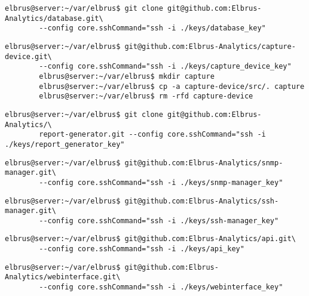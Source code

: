 \documentclass{article}
\begin{document}
	\begin{lstlisting}[caption={Clonen der Datenbank Software.}]
		elbrus@server:~/var/elbrus$ git clone git@github.com:Elbrus-Analytics/database.git\
		--config core.sshCommand="ssh -i ./keys/database_key"
	\end{lstlisting}
	
	\begin{lstlisting}[caption={Clonen der Capture-Device Software.}]
		elbrus@server:~/var/elbrus$ git@github.com:Elbrus-Analytics/capture-device.git\
		--config core.sshCommand="ssh -i ./keys/capture_device_key"
		elbrus@server:~/var/elbrus$ mkdir capture
		elbrus@server:~/var/elbrus$ cp -a capture-device/src/. capture
		elbrus@server:~/var/elbrus$ rm -rfd capture-device
	\end{lstlisting}
	

	\begin{lstlisting}[caption={Clonen der Report-Generator Software.}]
		elbrus@server:~/var/elbrus$ git clone git@github.com:Elbrus-Analytics/\
		report-generator.git --config core.sshCommand="ssh -i ./keys/report_generator_key"
	\end{lstlisting}
	
	\newpage
	\begin{lstlisting}[caption={Clonen der SNMP-Manager Software.}]
		elbrus@server:~/var/elbrus$ git@github.com:Elbrus-Analytics/snmp-manager.git\
		--config core.sshCommand="ssh -i ./keys/snmp-manager_key"
	\end{lstlisting}

	\begin{lstlisting}[caption={Clonen der SSH-Manager Software.}]
		elbrus@server:~/var/elbrus$ git@github.com:Elbrus-Analytics/ssh-manager.git\
		--config core.sshCommand="ssh -i ./keys/ssh-manager_key"
	\end{lstlisting}
	
	\begin{lstlisting}[caption={Clonen der API Software.}]
		elbrus@server:~/var/elbrus$ git@github.com:Elbrus-Analytics/api.git\
		--config core.sshCommand="ssh -i ./keys/api_key"
	\end{lstlisting}

	\begin{lstlisting}[caption={Clonen der Packet-Importer Software}]
		elbrus@server:~/var/elbrus$ git@github.com:Elbrus-Analytics/webinterface.git\
		--config core.sshCommand="ssh -i ./keys/webinterface_key"
	\end{lstlisting}
\end{document}
